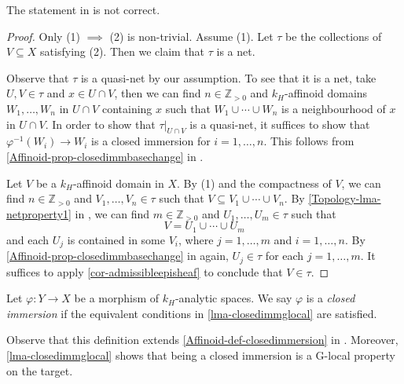 The statement in \cite[Lemma~1.3.7]{Berk93} is not correct.
\begin{proof}
    Only (1) $\implies$ (2) is non-trivial. Assume (1). Let $\tau$ be the collections of $V\subseteq X$ satisfying (2). Then we claim that $\tau$ is a net. 
    
    Observe that $\tau$ is a quasi-net by our assumption.
    To see that it is a net, take $U,V\in \tau$ and $x\in U\cap V$, then we can find $n\in \mathbb{Z}_{>0}$ and $k_H$-affinoid domains $W_1,\ldots,W_n$ in $U\cap V$ containing $x$ such that $W_1\cup\cdots\cup W_n$ is a neighbourhood of $x$ in $U\cap V$. In order to show that $\tau|_{U\cap V}$ is a quasi-net, it suffices to show that $\varphi^{-1}(W_i)\rightarrow W_i$ is a closed immersion for $i=1,\ldots,n$. This follows from \cref{Affinoid-prop-closedimmbasechange} in .

    Let $V$ be a $k_H$-affinoid domain in $X$.
    By (1) and the compactness of $V$, we can find $n\in \mathbb{Z}_{>0}$ and $V_1,\ldots,V_n\in \tau$ such that $V\subseteq V_1\cup\cdots\cup V_n$.
    By \cref{Topology-lma-netproperty1} in , we can find $m\in \mathbb{Z}_{>0}$ and $U_1,\ldots,U_m\in \tau$ such that
    \[
        V=U_1\cup\cdots\cup U_m  
    \]
    and each $U_j$ is contained in some $V_i$, where $j=1,\ldots,m$ and $i=1,\ldots,n$. By \cref{Affinoid-prop-closedimmbasechange} in  again, $U_j\in \tau$ for each $j=1,\ldots,m$. It suffices to apply \cref{cor-admissibleepisheaf} to conclude that $V\in \tau$.
\end{proof}

\begin{definition}
    Let $\varphi:Y\rightarrow X$ be a morphism of $k_H$-analytic spaces.  We say $\varphi$ is a \emph{closed immersion} if the equivalent conditions in \cref{lma-closedimmglocal} are satisfied.
\end{definition}
Observe that this definition extends \cref{Affinoid-def-closedimmersion} in . Moreover, \cref{lma-closedimmglocal} shows that being a closed immersion is a G-local property on the target.


